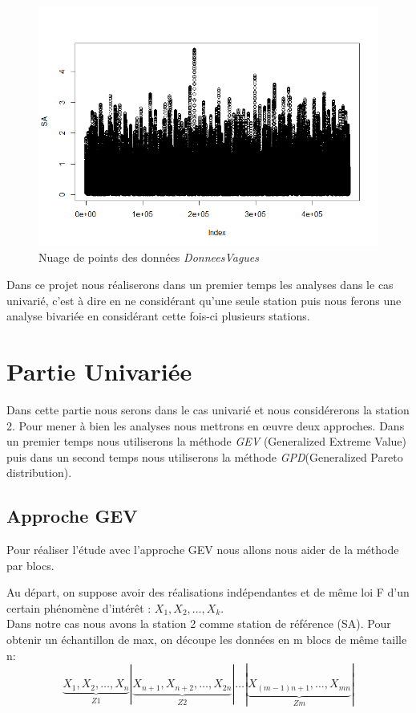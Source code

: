 \documentclass[a4paper,french,10pt]{article}
\begin{document}
\begin{figure}[htp] 
	\centering
	\includegraphics[scale=0.45]{images/graph_data.png}
	\caption{Nuage de points des données \textit{DonneesVagues}}
	\label{data}
\end{figure}

\newpage

Dans ce projet nous réaliserons dans un premier temps les analyses dans le cas univarié, c'est à dire en ne considérant qu'une seule station puis nous ferons une analyse bivariée en considérant cette fois-ci plusieurs stations.

\section{Partie Univariée}
Dans cette partie nous serons dans le cas univarié et nous considérerons la station 2.
Pour mener à bien les analyses nous mettrons en œuvre deux approches. Dans un premier temps nous utiliserons la méthode \textit{GEV} (Generalized Extreme Value) puis dans un second temps nous utiliserons la méthode \textit{GPD}(Generalized Pareto
distribution).
\subsection{Approche GEV}
Pour réaliser l'étude avec l'approche GEV nous allons nous aider de la méthode par blocs.

Au départ, on suppose avoir des réalisations indépendantes et de même loi F d’un certain
phénomène d’intérêt : $X_1, X_2,\dots, X_k$. \\
Dans notre cas nous avons la station 2 comme station de référence (SA).
Pour obtenir un échantillon de max, on découpe les données en m blocs de
même taille n:
\[
	\underbrace{X_1, X_2,\dots, X_n}_{Z1}| \underbrace{X_{n+1}, X_{n+2},\dots, X_{2n}}_{Z2}| \dots |\underbrace {X_{(m-1)n+1}, \dots, X_{mn}}_{Zm}|
\]
\end{document}
